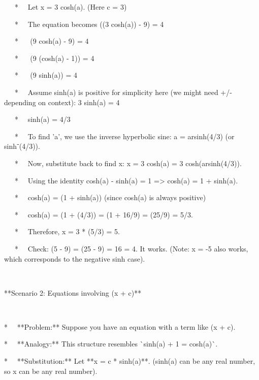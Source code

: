 \documentclass{article}
\newcommand{\nonconverted}[1]{\mbox{}}
\begin{document}
\ \ \ * \ \ Let x = 3 cosh(a). (Here c = 3)

\ \ \ * \ \ The equation becomes  \nonconverted{sqrt} ((3
cosh(a)){\texttwosuperior} - 9) = 4

\ \ \ * \ \  \nonconverted{sqrt} (9 cosh{\texttwosuperior}(a) - 9) = 4

\ \ \ * \ \  \nonconverted{sqrt} (9 (cosh{\texttwosuperior}(a) - 1)) = 4

\ \ \ * \ \  \nonconverted{sqrt} (9 sinh{\texttwosuperior}(a)) = 4

\ \ \ * \ \ Assume sinh(a) is positive for simplicity here (we might need +/-
depending on context): 3 sinh(a) = 4

\ \ \ * \ \ sinh(a) = 4/3

\ \ \ * \ \ To find 'a', we use the inverse hyperbolic sine: a = arsinh(4/3)
(or sinh⁻{\textonesuperior}(4/3)).

\ \ \ * \ \ Now, substitute back to find x: x = 3 cosh(a) = 3
cosh(arsinh(4/3)).

\ \ \ * \ \ Using the identity cosh{\texttwosuperior}(a) -
sinh{\texttwosuperior}(a) = 1 => cosh{\texttwosuperior}(a) = 1 +
sinh{\texttwosuperior}(a).

\ \ \ * \ \ cosh(a) =  \nonconverted{sqrt} (1 + sinh{\texttwosuperior}(a))
(since cosh(a) is always positive)

\ \ \ * \ \ cosh(a) =  \nonconverted{sqrt} (1 + (4/3){\texttwosuperior}) = 
\nonconverted{sqrt} (1 + 16/9) =  \nonconverted{sqrt} (25/9) = 5/3.

\ \ \ * \ \ Therefore, x = 3 * (5/3) = 5.

\ \ \ * \ \ Check:  \nonconverted{sqrt} (5{\texttwosuperior} - 9) = 
\nonconverted{sqrt} (25 - 9) =  \nonconverted{sqrt} 16 = 4. It works. (Note: x
= -5 also works, which corresponds to the negative sinh case).

\

**Scenario 2: Equations involving  \nonconverted{sqrt} (x{\texttwosuperior} +
c{\texttwosuperior})**

\

* \ \ **Problem:** Suppose you have an equation with a term like 
\nonconverted{sqrt} (x{\texttwosuperior} + c{\texttwosuperior}).

* \ \ **Analogy:** This structure resembles \`{}sinh{\texttwosuperior}(a) + 1
= cosh{\texttwosuperior}(a)\`{}.

* \ \ **Substitution:** Let **x = c * sinh(a)**. (sinh(a) can be any real
number, so x can be any real number).
\end{document}
